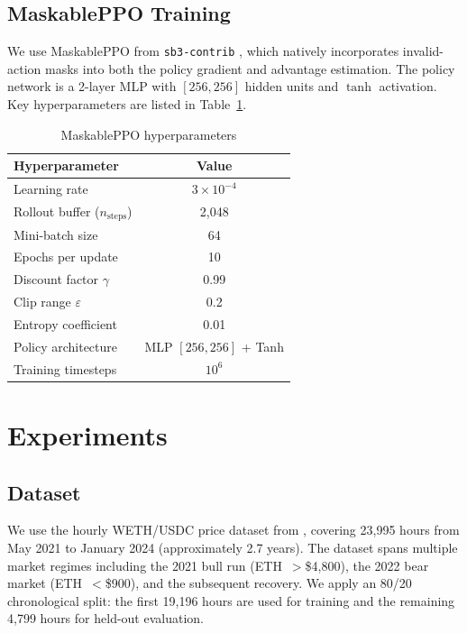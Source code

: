 \documentclass{article}
\begin{document}
\subsection{MaskablePPO Training}

We use MaskablePPO from \texttt{sb3-contrib} \citep{huang2022maskableppo},
which natively incorporates invalid-action masks into both the policy gradient
and advantage estimation.  The policy network is a 2-layer MLP with
$[256, 256]$ hidden units and $\tanh$ activation.  Key hyperparameters
are listed in Table~\ref{tab:hyperparams}.

\begin{table}[h]
\centering
\caption{MaskablePPO hyperparameters}
\label{tab:hyperparams}
\begin{tabular}{lc}
\toprule
Hyperparameter & Value \\
\midrule
Learning rate & $3 \times 10^{-4}$ \\
Rollout buffer ($n_{\text{steps}}$) & 2{,}048 \\
Mini-batch size & 64 \\
Epochs per update & 10 \\
Discount factor $\gamma$ & 0.99 \\
Clip range $\varepsilon$ & 0.2 \\
Entropy coefficient & 0.01 \\
Policy architecture & MLP $[256, 256]$ + Tanh \\
Training timesteps & $10^6$ \\
\bottomrule
\end{tabular}
\end{table}

\section{Experiments}

\subsection{Dataset}

We use the hourly WETH/USDC price dataset from \citet{xu2025}, covering
23{,}995 hours from May 2021 to January 2024 (approximately 2.7 years).
The dataset spans multiple market regimes including the 2021 bull run
(ETH~$>$\$4{,}800), the 2022 bear market (ETH~$<$\$900), and the subsequent
recovery.  We apply an 80/20 chronological split: the first 19{,}196 hours
are used for training and the remaining 4{,}799 hours for held-out evaluation.
\end{document}
